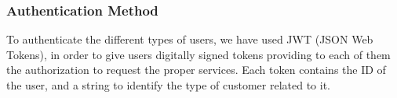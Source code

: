 \subsubsection{Authentication Method}
To authenticate the different types of users, we have used JWT (JSON Web Tokens), in order to give users digitally signed tokens providing to each of them the authorization to request the proper services. Each token contains the ID of the user, and a string to identify the type of customer related to it.

\newpage



